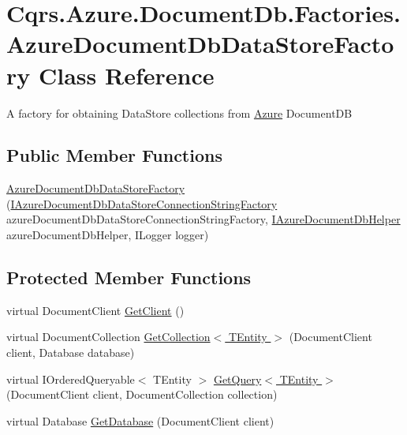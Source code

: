\hypertarget{classCqrs_1_1Azure_1_1DocumentDb_1_1Factories_1_1AzureDocumentDbDataStoreFactory}{}\section{Cqrs.\+Azure.\+Document\+Db.\+Factories.\+Azure\+Document\+Db\+Data\+Store\+Factory Class Reference}
\label{classCqrs_1_1Azure_1_1DocumentDb_1_1Factories_1_1AzureDocumentDbDataStoreFactory}


A factory for obtaining Data\+Store collections from \hyperlink{namespaceCqrs_1_1Azure}{Azure} Document\+DB  


\subsection*{Public Member Functions}
\begin{DoxyCompactItemize}
\item 
\hyperlink{classCqrs_1_1Azure_1_1DocumentDb_1_1Factories_1_1AzureDocumentDbDataStoreFactory_a7bafe0acfcbb5eaacb5cd2714c39fa08_a7bafe0acfcbb5eaacb5cd2714c39fa08}{Azure\+Document\+Db\+Data\+Store\+Factory} (\hyperlink{interfaceCqrs_1_1Azure_1_1DocumentDb_1_1Factories_1_1IAzureDocumentDbDataStoreConnectionStringFactory}{I\+Azure\+Document\+Db\+Data\+Store\+Connection\+String\+Factory} azure\+Document\+Db\+Data\+Store\+Connection\+String\+Factory, \hyperlink{interfaceCqrs_1_1Azure_1_1DocumentDb_1_1IAzureDocumentDbHelper}{I\+Azure\+Document\+Db\+Helper} azure\+Document\+Db\+Helper, I\+Logger logger)
\end{DoxyCompactItemize}
\subsection*{Protected Member Functions}
\begin{DoxyCompactItemize}
\item 
virtual Document\+Client \hyperlink{classCqrs_1_1Azure_1_1DocumentDb_1_1Factories_1_1AzureDocumentDbDataStoreFactory_a4e7ff98b4f48fdc078a12f97c39d1bbb_a4e7ff98b4f48fdc078a12f97c39d1bbb}{Get\+Client} ()
\item 
virtual Document\+Collection \hyperlink{classCqrs_1_1Azure_1_1DocumentDb_1_1Factories_1_1AzureDocumentDbDataStoreFactory_ad0a8f33b95b2ffba1d8bb86db389d327_ad0a8f33b95b2ffba1d8bb86db389d327}{Get\+Collection$<$ T\+Entity $>$} (Document\+Client client, Database database)
\item 
virtual I\+Ordered\+Queryable$<$ T\+Entity $>$ \hyperlink{classCqrs_1_1Azure_1_1DocumentDb_1_1Factories_1_1AzureDocumentDbDataStoreFactory_a8064c08a0b784283199bf8c0b94675e6_a8064c08a0b784283199bf8c0b94675e6}{Get\+Query$<$ T\+Entity $>$} (Document\+Client client, Document\+Collection collection)
\item 
virtual Database \hyperlink{classCqrs_1_1Azure_1_1DocumentDb_1_1Factories_1_1AzureDocumentDbDataStoreFactory_a0d010038f250f91446b9d94277c02c44_a0d010038f250f91446b9d94277c02c44}{Get\+Database} (Document\+Client client)
\end{DoxyCompactItemize}

